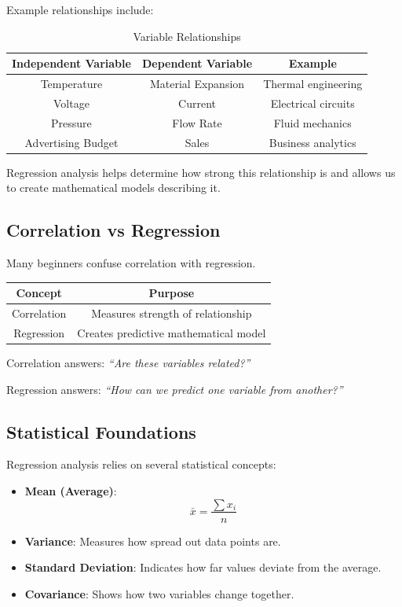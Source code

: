 \documentclass[12pt,a4paper]{article}
\begin{document}
	Example relationships include:
	
	\begin{table}[h!]
		\centering
		\begin{tabular}{|c|c|c|}
			\hline
			\textbf{Independent Variable} & \textbf{Dependent Variable} & \textbf{Example} \\
			\hline
			Temperature & Material Expansion & Thermal engineering \\
			Voltage & Current & Electrical circuits \\
			Pressure & Flow Rate & Fluid mechanics \\
			Advertising Budget & Sales & Business analytics \\
			\hline
		\end{tabular}
		\caption{Variable Relationships}
	\end{table}
	
	Regression analysis helps determine how strong this relationship is and allows us to create mathematical models describing it.
	
	\subsection{Correlation vs Regression}
	Many beginners confuse correlation with regression.
	
	\begin{table}[h!]
		\centering
		\begin{tabular}{|c|c|}
			\hline
			\textbf{Concept} & \textbf{Purpose} \\
			\hline
			Correlation & Measures strength of relationship \\
			Regression & Creates predictive mathematical model \\
			\hline
		\end{tabular}
	\end{table}
	
	Correlation answers: \textit{“Are these variables related?”}
	
	Regression answers: \textit{“How can we predict one variable from another?”}
	
	\subsection{Statistical Foundations}
	Regression analysis relies on several statistical concepts:
	\begin{itemize}
		\item \textbf{Mean (Average)}:
		\[
		\bar{x} = \frac{\sum x_i}{n}
		\]
		\item \textbf{Variance}: Measures how spread out data points are.
		\item \textbf{Standard Deviation}: Indicates how far values deviate from the average.
		\item \textbf{Covariance}: Shows how two variables change together.
	\end{itemize}
	
\end{document}
